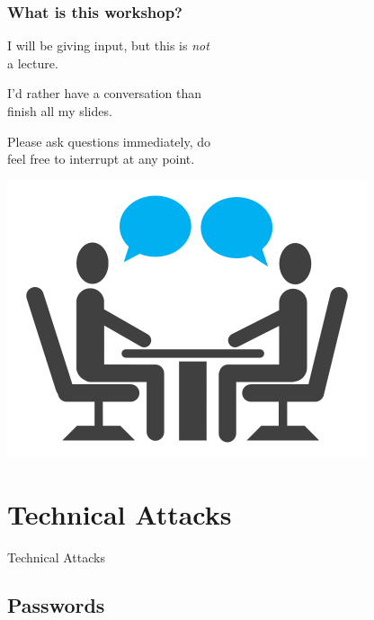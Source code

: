 \documentclass[aspectratio=169,dvipsnames]{beamer}
\begin{document}
\begin{frame}
\frametitle{What is this workshop?}

\begin{minipage}{0.5\textwidth}
I will be giving input, but this is \emph{not}\\ a lecture.
\bigskip

I'd rather have a conversation than\\ finish all my slides.
\bigskip

Please ask questions immediately, do\\ feel free to interrupt at any point.
\end{minipage}%
\begin{minipage}{0.5\textwidth}
\begin{center}
\includegraphics[scale=0.6,keepaspectratio]{images/conversation.png} 
\end{center}
\end{minipage}
\end{frame}


\section{Technical Attacks}
\begin{frame}
\begin{center}
\huge Technical Attacks\normalsize
\end{center}
\end{frame}

\subsection{Passwords}
\end{document}
